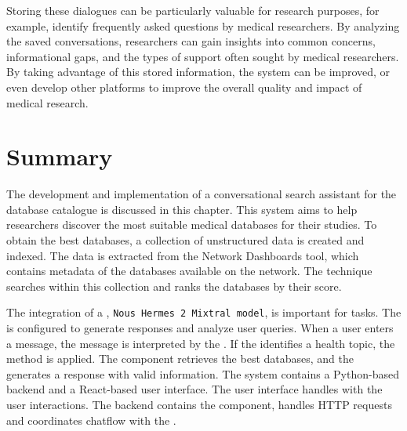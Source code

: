 Storing these dialogues can be particularly valuable for research purposes, for example, identify frequently asked questions by medical researchers. By analyzing the saved conversations, researchers can gain insights into common concerns, informational gaps, and the types of support often sought by medical researchers. By taking advantage of this stored information, the system can be improved, or even develop other platforms to improve the overall quality and impact of medical research.



\section{Summary}

The development and implementation of a conversational search assistant for the {\ehden} database catalogue is discussed in this chapter. This system aims to help researchers discover the most suitable medical databases for their studies. To obtain the best databases, a collection of unstructured data is created and indexed. The data is extracted from the {\ehden} Network Dashboards tool, which contains metadata of the databases available on the {\ehden} network. The {\bm} technique searches within this collection and ranks the databases by their score.

The integration of a {\llm}, \texttt{Nous Hermes 2 Mixtral model}, is important for {\nlp} tasks. The {\llm} is configured to generate responses and analyze user queries. When a user enters a message, the message is interpreted by the {\llm}. If the {\llm} identifies a health topic, the {\rag} method is applied. The {\ir} component retrieves the best databases, and the {\llm} generates a response with valid information. The system contains a Python-based backend and a React-based user interface. The user interface handles with the user interactions. The backend contains the {\ir} component, handles HTTP requests and coordinates chatflow with the {\llm}.